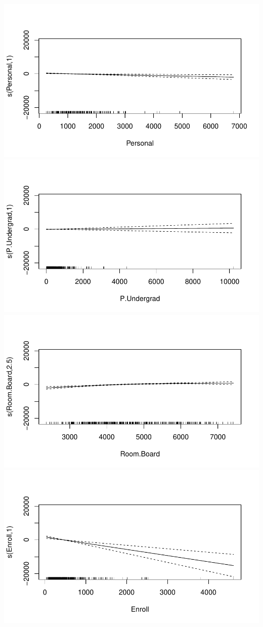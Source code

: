 \documentclass[
]{article}
\begin{document}
\includegraphics[width=0.9\linewidth]{HW2_co2554_files/figure-latex/GAM-9}
\includegraphics[width=0.9\linewidth]{HW2_co2554_files/figure-latex/GAM-10}
\includegraphics[width=0.9\linewidth]{HW2_co2554_files/figure-latex/GAM-11}
\includegraphics[width=0.9\linewidth]{HW2_co2554_files/figure-latex/GAM-12}
\end{document}
